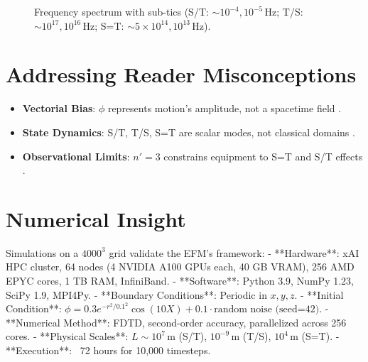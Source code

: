 \documentclass[11pt]{article}
\begin{document}
\begin{figure}[htbp]
\centering
{}
\caption{Frequency spectrum with sub-tics (S/T: \(\sim 10^{-4}, 10^{-5} \, \text{Hz}\); T/S: \(\sim 10^{17}, 10^{16} \, \text{Hz}\); S=T: \(\sim 5 \times 10^{14}, 10^{13} \, \text{Hz}\)).}
\label{fig:frequency_spectrum}
\end{figure}

\section{Addressing Reader Misconceptions}
\begin{itemize}
    \item \textbf{Vectorial Bias}: \(\phi\) represents motion’s amplitude, not a spacetime field \citep{larson1959}.
    \item \textbf{State Dynamics}: S/T, T/S, S=T are scalar modes, not classical domains \citep{emvula2025compendium}.
    \item \textbf{Observational Limits}: \(n' = 3\) constrains equipment to S=T and S/T effects \citep{emvula2025compendium}.
\end{itemize}

\section{Numerical Insight}
Simulations on a \(4000^3\) grid validate the EFM’s framework:
- **Hardware**: xAI HPC cluster, 64 nodes (4 NVIDIA A100 GPUs each, 40 GB VRAM), 256 AMD EPYC cores, 1 TB RAM, InfiniBand.
- **Software**: Python 3.9, NumPy 1.23, SciPy 1.9, MPI4Py.
- **Boundary Conditions**: Periodic in \(x, y, z\).
- **Initial Condition**: \(\phi = 0.3 e^{-r^2 / 0.1^2} \cos(10 X) + 0.1 \cdot \text{random noise (seed=42)}\).
- **Numerical Method**: FDTD, second-order accuracy, parallelized across 256 cores.
- **Physical Scales**: \(L \sim 10^7 \, \text{m}\) (S/T), \(10^{-9} \, \text{m}\) (T/S), \(10^4 \, \text{m}\) (S=T).
- **Execution**: ~72 hours for 10,000 timesteps.
\end{document}
